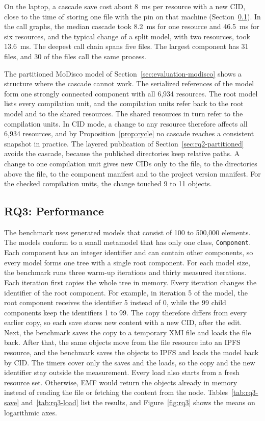 \documentclass[5p,times,twocolumn]{elsarticle}
\theoremstyle{definition}
\theoremstyle{plain}
\begin{document}
On the laptop, a cascade save cost about 8~ms per resource with a new CID, close to the time of storing one file with the pin on that machine (Section~\ref{sec:evaluation-rq3}). In the call graphs, the median cascade took 8.2~ms for one resource and 46.5~ms for six resources, and the typical change of a split model, with two resources, took 13.6~ms. The deepest call chain spans five files. The largest component has 31 files, and 30 of the files call the same process.

The partitioned MoDisco model of Section~\ref{sec:evaluation-modisco} shows a structure where the cascade cannot work. The serialized references of the model form one strongly connected component with all 6,934 resources. The root model lists every compilation unit, and the compilation units refer back to the root model and to the shared resources. The shared resources in turn refer to the compilation units. In CID mode, a change to any resource therefore affects all 6,934 resources, and by Proposition~\ref{prop:cycle} no cascade reaches a consistent snapshot in practice. The layered publication of Section~\ref{sec:rq2-partitioned} avoids the cascade, because the published directories keep relative paths. A change to one compilation unit gives new CIDs only to the file, to the directories above the file, to the component manifest and to the project version manifest. For the checked compilation units, the change touched 9 to 11 objects.

\subsection{RQ3: Performance}\label{sec:evaluation-rq3}

The benchmark uses generated models that consist of 100 to 500,000 elements. The models conform to a small metamodel that has only one class, \texttt{Component}. Each component has an integer identifier and can contain other components, so every model forms one tree with a single root component. For each model size, the benchmark runs three warm-up iterations and thirty measured iterations. Each iteration first copies the whole tree in memory. Every iteration changes the identifier of the root component. For example,  in iteration 5 of the model, the root component receives the identifier 5 instead of 0, while the 99 child components keep the identifiers 1 to 99. The copy therefore differs from every earlier copy, so each save stores new content with a new CID, after the edit. Next, the benchmark saves the copy to a temporary XMI file and loads the file back. After that, the same objects move from the file resource into an IPFS resource, and the benchmark saves the objects to IPFS and loads the model back by CID. The timers cover only the saves and the loads, so the copy and the new identifier stay outside the measurement. Every load also starts from a fresh resource set. Otherwise, EMF would return the objects already in memory instead of reading the file or fetching the content from the node. Tables~\ref{tab:rq3-save} and~\ref{tab:rq3-load} list the results, and Figure~\ref{fig:rq3} shows the means on logarithmic axes.
\end{document}
